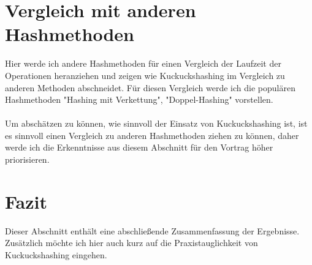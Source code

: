 \documentclass{article}
\begin{document}
\section{Vergleich mit anderen Hashmethoden}
Hier werde ich andere Hashmethoden für einen Vergleich der Laufzeit der Operationen heranziehen und zeigen wie Kuckuckshashing im Vergleich zu anderen Methoden abschneidet. 
Für diesen Vergleich werde ich die populären Hashmethoden "Hashing mit Verkettung", "Doppel-Hashing" vorstellen.
\\ \\
Um abschätzen zu können, wie sinnvoll der Einsatz von Kuckuckshashing ist, ist es sinnvoll einen Vergleich zu anderen Hashmethoden ziehen zu können, daher werde ich die 
Erkenntnisse aus diesem Abschnitt für den Vortrag höher priorisieren.

\section{Fazit}
Dieser Abschnitt enthält eine abschließende Zusammenfassung der Ergebnisse. Zusätzlich möchte ich hier auch kurz auf die Praxistauglichkeit von Kuckuckshashing eingehen.
\end{document}
